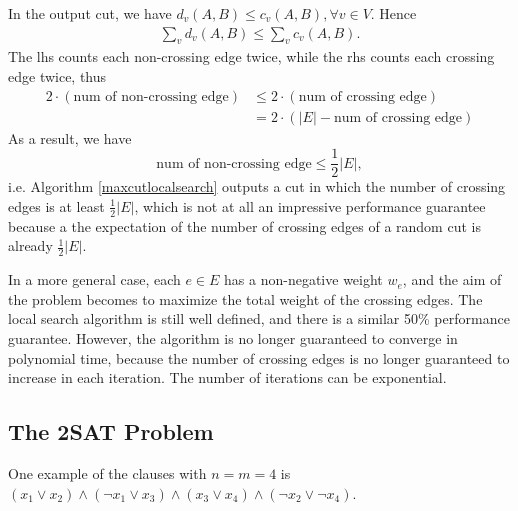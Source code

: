 In the output cut, we have $d_v(A,B)\leq c_v(A,B),\forall v\in V$. Hence 
\begin{align*}
\sum_vd_v(A,B)\leq \sum_vc_v(A,B).
\end{align*}
The lhs counts each non-crossing edge twice, while the rhs counts each crossing edge twice, thus 
\begin{align*}
2\cdot(\text{num of non-crossing edge})&\leq 2\cdot(\text{num of crossing edge})\\
&=2\cdot(\lvert E\rvert-\text{num of crossing edge})
\end{align*}
As a result, we have 
$$\text{num of non-crossing edge}\leq\frac{1}{2}\lvert E\rvert,$$ i.e. Algorithm \ref{maxcutlocalsearch} outputs a cut in which the number of crossing edges is at least $\frac{1}{2}\lvert E\rvert$, which is not at all an impressive performance guarantee because a the expectation of the number of crossing edges of a random cut is already $\frac{1}{2}\lvert E\rvert$.

In a more general case, each $e\in E$ has a non-negative weight $w_e$, and the aim of the problem becomes to maximize the total weight of the crossing edges. The local search algorithm is still well defined, and there is a similar 50\% performance guarantee. However, the algorithm is no longer guaranteed to converge in polynomial time, because the number of crossing edges is no longer guaranteed to increase in each iteration. The number of iterations can be exponential.
\subsection{The 2SAT Problem}
\begin{description}
\end{description}
One example of the clauses with $n=m=4$ is $(x_1\lor x_2)\land(\neg x_1\lor x_3)\land(x_3\lor x_4)\land(\neg x_2\lor\neg x_4)$.

